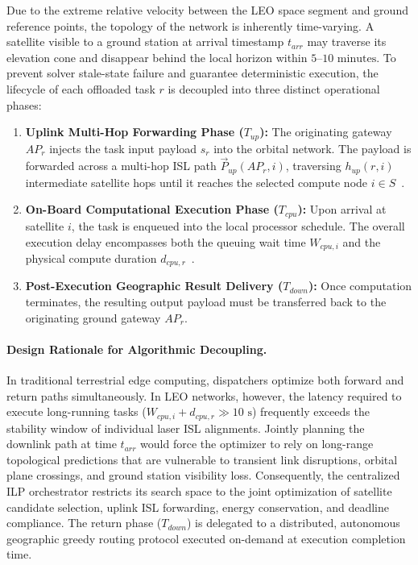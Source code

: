 Due to the extreme relative velocity between the LEO space segment and ground reference points, the topology of the network is inherently time-varying. 
A satellite visible to a ground station at arrival timestamp $t_{arr}$ may traverse its elevation cone and disappear behind the local horizon within $5\text{--}10\text{ minutes}$. 
To prevent solver stale-state failure and guarantee deterministic execution, the lifecycle of each offloaded task $r$ is decoupled into three distinct operational phases:
\begin{enumerate}
    \item \textbf{Uplink Multi-Hop Forwarding Phase ($T_{up}$):} The originating gateway $AP_r$ injects the task input payload $s_r$ into the orbital network. The payload is forwarded across a multi-hop ISL path $\vec{P}_{up}(AP_r, i)$, traversing $h_{up}(r,i)$ intermediate satellite hops until it reaches the selected compute node $i \in S$~\cite{icdcs_satellite_2025}.
    \item \textbf{On-Board Computational Execution Phase ($T_{cpu}$):} Upon arrival at satellite $i$, the task is enqueued into the local processor schedule. The overall execution delay encompasses both the queuing wait time $W_{cpu,i}$ and the physical compute duration $d_{cpu,r}$~\cite{denby2019orbital, icdcs_satellite_2025}.
    \item \textbf{Post-Execution Geographic Result Delivery ($T_{down}$):} Once computation terminates, the resulting output payload must be transferred back to the originating ground gateway $AP_r$. 
\end{enumerate}

\paragraph{Design Rationale for Algorithmic Decoupling.} 
In traditional terrestrial edge computing, dispatchers optimize both forward and return paths simultaneously. In LEO networks, however, the latency required to execute long-running tasks ($W_{cpu,i} + d_{cpu,r} \gg 10\text{ s}$) frequently exceeds the stability window of individual laser ISL alignments. 
Jointly planning the downlink path at time $t_{arr}$ would force the optimizer to rely on long-range topological predictions that are vulnerable to transient link disruptions, orbital plane crossings, and ground station visibility loss. 
Consequently, the centralized ILP orchestrator restricts its search space to the joint optimization of satellite candidate selection, uplink ISL forwarding, energy conservation, and deadline compliance. 
The return phase ($T_{down}$) is delegated to a distributed, autonomous geographic greedy routing protocol executed on-demand at execution completion time.

